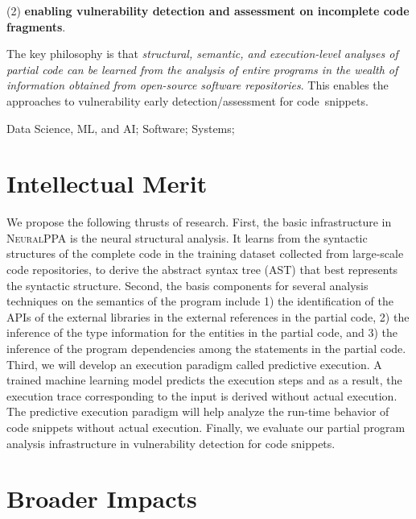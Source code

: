 \documentclass[11pt]{article}
\newcommand{\tool}{\textsc{NeuralPPA}\xspace}
\begin{document}
(2) {\bf enabling vulnerability detection and assessment on incomplete code fragments}.

The key philosophy is that {\em structural, semantic, and
  execution-level analyses of partial code can be learned from the
  analysis of entire programs in the wealth of information obtained
  from open-source software repositories}. This enables the approaches
to vulnerability early detection/assessment for code~snippets.


 Data Science, ML, and AI; Software; Systems;

\section{Intellectual Merit}


We propose the following thrusts of research. First, the basic
infrastructure in {\tool} is the neural structural analysis. It learns
from the syntactic structures of the complete code in the training
dataset collected from large-scale code repositories, to derive the
abstract syntax tree (AST) that best represents the syntactic
structure.
Second, the basis components for several analysis techniques on the
semantics of the program include 1) the identification of the APIs of
the external libraries in the external references in the partial code,
2) the inference of the type information for the entities in the
partial code, and 3) the inference of the program dependencies among
the statements in the partial code. Third, we will develop an
execution paradigm called predictive execution. A trained machine
learning model predicts the execution steps and as a result, the
execution trace corresponding to the input is derived without actual
execution. The predictive execution paradigm will help analyze the
run-time behavior of code snippets without actual execution. Finally,
we evaluate our partial program analysis infrastructure in
vulnerability detection for code snippets.




\section{Broader Impacts}
\end{document}
